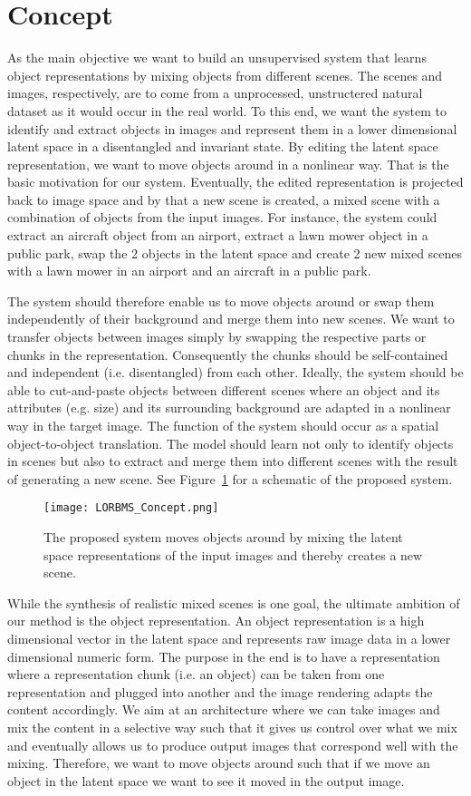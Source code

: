 \documentclass[a4paper,12pt]{report}
\begin{document}
\section{Concept}\label{subsec:concept}
As the main objective we want to build an unsupervised system that learns object representations by mixing objects from different scenes. The scenes and images, respectively, are to come from a unprocessed, unstructered natural dataset as it would occur in the real world. To this end, we want the system to identify and extract objects in images and represent them in a lower dimensional latent space in a disentangled and invariant state. By editing the latent space representation, we want to move objects around in a nonlinear way. That is the basic motivation for our system. Eventually, the edited representation is projected back to image space and by that a new scene is created, a mixed scene with a combination of objects from the input images. For instance, the system could extract an aircraft object from an airport, extract a lawn mower object in a public park, swap the 2 objects in the latent space and create 2 new mixed scenes with a lawn mower in an airport and an aircraft in a public park. 

The system should therefore enable us to move objects around or swap them independently of their background and merge them into new scenes. We want to transfer objects between images simply by swapping the respective parts or chunks in the representation. Consequently the chunks should be self-contained and independent (i.e. disentangled) from each other. Ideally, the system should be able to cut-and-paste objects between different scenes where an object and its attributes (e.g. size) and its surrounding background are adapted in a nonlinear way in the target image. The function of the system should occur as a spatial object-to-object translation. The model should learn not only to identify objects in scenes but also to extract and merge them into different scenes with the result of generating a new scene. See Figure~\ref{fig:concet_lorbms} for a schematic of the proposed system.
\begin{figure}[ht]
\centering
\texttt{[image: LORBMS\_Concept.png]}
\caption{The proposed system moves objects around by mixing the latent space representations of the input images and thereby creates a new scene.}
\label{fig:concet_lorbms}
\end{figure}
While the synthesis of realistic mixed scenes is one goal, the ultimate ambition of our method is the object representation. An object representation is a high dimensional vector in the latent space and represents raw image data in a lower dimensional numeric form. The purpose in the end is to have a representation where a representation chunk (i.e. an object) can be taken from one representation and plugged into another and the image rendering adapts the content accordingly. We aim at an architecture where we can take images and mix the content in a selective way such that it gives us control over what we mix and eventually allows us to produce output images that correspond well with the mixing. Therefore, we want to move objects around such that if we move an object in the latent space we want to see it moved in the output image. 
\end{document}
